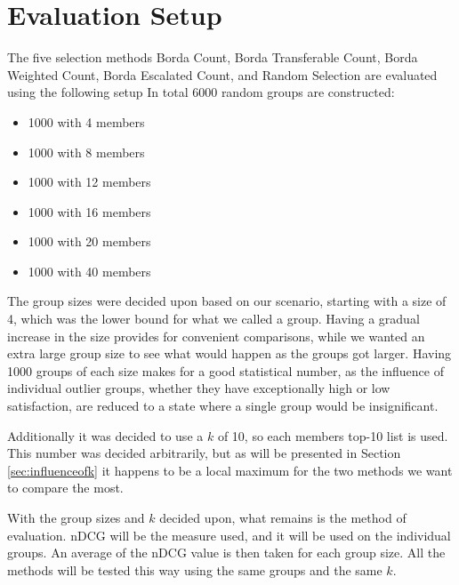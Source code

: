 \section{Evaluation Setup}
The five selection methods Borda Count, Borda Transferable Count, Borda Weighted Count, Borda Escalated Count, and Random Selection are evaluated using the following setup
In total 6000 random groups are constructed:

\begin{itemize}
	\item 1000 with 4 members
	\item 1000 with 8 members
	\item 1000 with 12 members
	\item 1000 with 16 members
	\item 1000 with 20 members
	\item 1000 with 40 members
\end{itemize}

The group sizes were decided upon based on our scenario, starting with a size of 4, which was the lower bound for what we called a group. Having a gradual increase in the size provides for convenient comparisons, while we wanted an extra large group size to see what would happen as the groups got larger. 
Having 1000 groups of each size makes for a good statistical number, as the influence of individual outlier groups, whether they have exceptionally high or low satisfaction, are reduced to a state where a single group would be insignificant.

Additionally it was decided to use a $k$ of 10, so each members top-10 list is used. This number was decided arbitrarily, but as will be presented in Section \ref{sec:influenceofk} it happens to be a local maximum for the two methods we want to compare the most.

With the group sizes and $k$ decided upon, what remains is the method of evaluation. nDCG will be the measure used, and it will be used on the individual groups. An average of the nDCG value is then taken for each group size. All the methods will be tested this way using the same groups and the same $k$.







